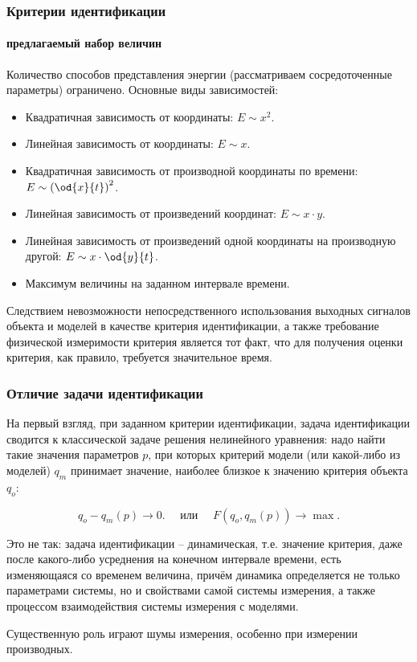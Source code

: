 \documentclass[10pt,utf8]{beamer}
\begin{document}
\begin{frame}
  \frametitle{Критерии идентификации}
  \framesubtitle{предлагаемый набор величин}

Количество способов
представления энергии (рассматриваем сосредоточенные параметры)
ограничено. Основные виды зависимостей:

\begin{itemize}

  \item
    Квадратичная зависимость от координаты: $E \sim x^2$.

  \item
    Линейная зависимость от координаты: $E \sim x$.

  \item
    Квадратичная зависимость от производной координаты по времени: $E \sim \left( \od{x}{t}\right)^2$.

  \item
    Линейная зависимость от произведений координат: $E \sim x \cdot y$.

  \item
    Линейная зависимость от произведений одной координаты на производную другой: $E \sim x \cdot \od{y}{t}$.

  \item
    Максимум величины на заданном интервале времени.

 \end{itemize}

  Следствием невозможности непосредственного использования выходных
  сигналов объекта и моделей в качестве критерия идентификации, а также
  требование физической измеримости критерия является
  тот факт, что для получения оценки критерия, как правило,
  требуется значительное время.

\end{frame}




\begin{frame}
  \frametitle{Отличие задачи идентификации}

  На первый взгляд, при заданном критерии идентификации, задача идентификации
  сводится к классической задаче решения нелинейного уравнения: надо найти такие значения
  параметров $p$, при которых критерий модели (или какой-либо из моделей)
  $q_m$ принимает значение, наиболее близкое к значению критерия объекта $q_o$:

  \[
    q_o - q_m(p) \to 0.
    \quad
    \text{ или }
    \quad
    F( q_o, q_m(p) ) \to \max.
  \]

  Это не так:
  задача идентификации -- динамическая, т.е.
  значение критерия, даже после какого-либо усреднения на конечном
  интервале времени, есть изменяющаяся со временем величина, причём динамика определяется
  не только параметрами системы, но и свойствами самой системы измерения,
  а также процессом взаимодействия системы измерения с моделями.

  Существенную роль играют шумы измерения, особенно при измерении производных.
\end{frame}
\end{document}

